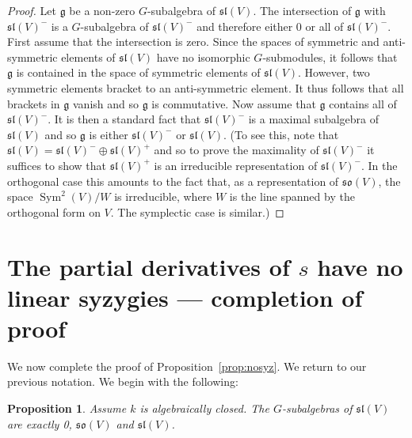\documentclass{amsart}
\newtheorem{proposition}[theorem]{Proposition}
\theoremstyle{definition}
\theoremstyle{remark}
\DeclareMathOperator{\Sym}{Sym}
\let\mf\mathfrak
\begin{document}
\begin{proof}
Let $\mf{g}$ be a non-zero $G$-subalgebra of $\mf{sl}(V)$.  The intersection of
$\mf{g}$ with $\mf{sl}(V)^-$ is a $G$-subalgebra of $\mf{sl}(V)^-$ and
therefore either 0 or all of $\mf{sl}(V)^-$.  First assume that the
intersection is zero.  Since the spaces of symmetric and
anti-symmetric elements of $\mf{sl}(V)$ have no isomorphic $G$-submodules,
it follows that $\mf{g}$ is contained in the space of symmetric elements of
$\mf{sl}(V)$.  However, two symmetric elements bracket to an anti-symmetric
element.  It thus follows that all brackets in $\mf{g}$ vanish and so $\mf{g}$
is commutative.  Now assume that $\mf{g}$ contains all of $\mf{sl}(V)^-$.  It
is then a standard fact that $\mf{sl}(V)^-$ is a maximal subalgebra of
$\mf{sl}(V)$ and so $\mf{g}$ is either $\mf{sl}(V)^-$ or $\mf{sl}(V)$.  (To
see this, note that $\mf{sl}(V)=\mf{sl}(V)^- \oplus \mf{sl}(V)^+$ and so
to prove the maximality of $\mf{sl}(V)^-$ it suffices to show that
$\mf{sl}(V)^+$ is an irreducible representation of $\mf{sl}(V)^-$.  In
the orthogonal case this amounts to the fact that, as a representation of
$\mf{so}(V)$, the space $\Sym^2(V)/W$ is irreducible, where $W$ is the line
spanned by the orthogonal form on $V$.  The symplectic case is similar.)
\end{proof}


\section{The partial derivatives of $s$ have no linear syzygies --- completion
of proof}

We now complete the proof of Proposition~\ref{prop:nosyz}.  We return to our
previous notation.  We begin with the following:

\begin{proposition}
\label{prop:subalg}
Assume $k$ is algebraically closed.  The $G$-subalgebras of $\mf{sl}(V)$ are
exactly 0, $\mf{so}(V)$ and $\mf{sl}(V)$.
\end{proposition}
\end{document}
